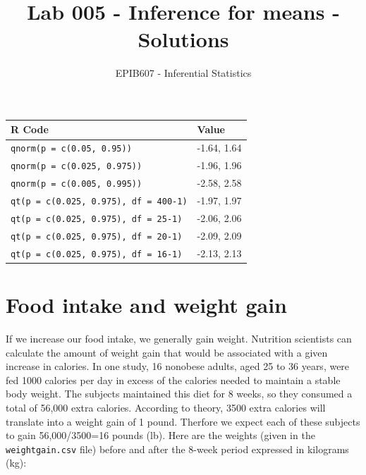\documentclass[letterpaper,11pt,twoside,]{pinp}
\title{Lab 005 - Inference for means - Solutions}
\author[a]{EPIB607 - Inferential Statistics}
\affil[a]{McGill University}
\begin{document}
\verticaladjustment{-2pt}

\maketitle
\thispagestyle{firststyle}



\begin{longtable}[]{@{}ll@{}}
\toprule
R Code & Value \\
\midrule
\endhead
\texttt{qnorm(p\ =\ c(0.05,\ 0.95))} & -1.64, 1.64 \\
\texttt{qnorm(p\ =\ c(0.025,\ 0.975))} & -1.96, 1.96 \\
\texttt{qnorm(p\ =\ c(0.005,\ 0.995))} & -2.58, 2.58 \\
\texttt{qt(p\ =\ c(0.025,\ 0.975),\ df\ =\ 400-1)} & -1.97, 1.97 \\
\texttt{qt(p\ =\ c(0.025,\ 0.975),\ df\ =\ 25-1)} & -2.06, 2.06 \\
\texttt{qt(p\ =\ c(0.025,\ 0.975),\ df\ =\ 20-1)} & -2.09, 2.09 \\
\texttt{qt(p\ =\ c(0.025,\ 0.975),\ df\ =\ 16-1)} & -2.13, 2.13 \\
\bottomrule
\end{longtable}

\hypertarget{food-intake-and-weight-gain}{%
\section{Food intake and weight
gain}\label{food-intake-and-weight-gain}}

If we increase our food intake, we generally gain weight. Nutrition
scientists can calculate the amount of weight gain that would be
associated with a given increase in calories. In one study, 16 nonobese
adults, aged 25 to 36 years, were fed 1000 calories per day in excess of
the calories needed to maintain a stable body weight. The subjects
maintained this diet for 8 weeks, so they consumed a total of 56,000
extra calories. According to theory, 3500 extra calories will translate
into a weight gain of 1 pound. Therfore we expect each of these subjects
to gain 56,000/3500=16 pounds (lb). Here are the weights (given in the
\texttt{weightgain.csv} file) before and after the 8-week period
expressed in kilograms (kg):
\end{document}
